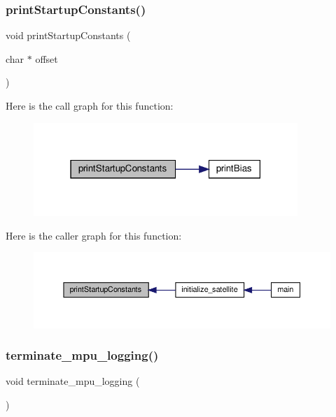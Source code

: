 \subsubsection{\texorpdfstring{print\+Startup\+Constants()}{printStartupConstants()}}
{\footnotesize\ttfamily void print\+Startup\+Constants (\begin{DoxyParamCaption}\item[{char $\ast$}]{offset }\end{DoxyParamCaption})}

Here is the call graph for this function\+:\nopagebreak
\begin{figure}[H]
\begin{center}
\leavevmode
\includegraphics[width=283pt]{i2c-interface_8h_a7584f35073e31c1833be60c696482e9a_cgraph}
\end{center}
\end{figure}
Here is the caller graph for this function\+:\nopagebreak
\begin{figure}[H]
\begin{center}
\leavevmode
\includegraphics[width=350pt]{i2c-interface_8h_a7584f35073e31c1833be60c696482e9a_icgraph}
\end{center}
\end{figure}
\mbox{\label{i2c-interface_8h_a3644aefb56a2169f316b0f2510ffc56c}} 
\subsubsection{\texorpdfstring{terminate\+\_\+mpu\+\_\+logging()}{terminate\_mpu\_logging()}}
{\footnotesize\ttfamily void terminate\+\_\+mpu\+\_\+logging (\begin{DoxyParamCaption}{ }\end{DoxyParamCaption})}

